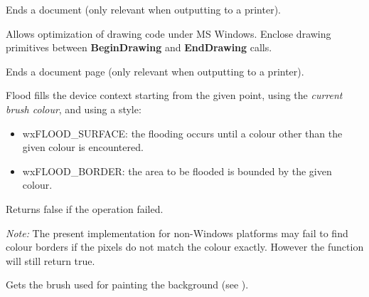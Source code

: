 \label{wxdcenddoc}


Ends a document (only relevant when outputting to a printer).


\label{wxdcenddrawing}


Allows optimization of drawing code under MS Windows. Enclose
drawing primitives between {\bf BeginDrawing} and {\bf EndDrawing}\rtfsp
calls.


\label{wxdcendpage}


Ends a document page (only relevant when outputting to a printer).


\label{wxdcfloodfill}


Flood fills the device context starting from the given point, using
the {\it current brush colour}, and using a style:

\begin{itemize}\itemsep=0pt
\item wxFLOOD\_SURFACE: the flooding occurs until a colour other than the given colour is encountered.
\item wxFLOOD\_BORDER: the area to be flooded is bounded by the given colour.
\end{itemize}

Returns false if the operation failed.

{\it Note:} The present implementation for non-Windows platforms may fail to find
colour borders if the pixels do not match the colour exactly. However the
function will still return true.


\label{wxdcgetbackground}



Gets the brush used for painting the background (see ).


\label{wxdcgetbackgroundmode}


